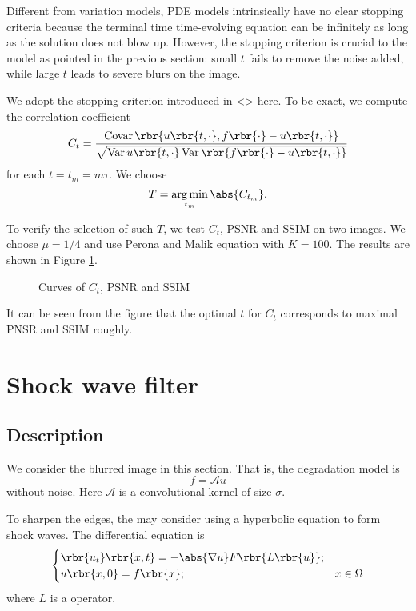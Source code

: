 \documentclass[english, nochinese]{pnote}
\DeclareMathOperator\opvar{\mathrm{Var}}
\DeclareMathOperator\opcovar{\mathrm{Covar}}
\begin{document}
Different from variation models, PDE models intrinsically have no clear stopping criteria because the terminal time time-evolving equation can be infinitely as long as the solution does not blow up. However, the stopping criterion is crucial to the model as pointed in the previous section: small $t$ fails to remove the noise added, while large $t$ leads to severe blurs on the image.

We adopt the stopping criterion introduced in <> here. To be exact, we compute the correlation coefficient
\begin{equation}
C_t = \frac{ \opcovar \rbr{ u \rbr{ t, \cdot }, f \rbr{\cdot} - u \rbr{ t, \cdot } } }{\sqrt{ \opvar u \rbr{ t, \cdot } \opvar \rbr{ f \rbr{\cdot} - u \rbr{ t, \cdot } } }}
\end{equation}
for each $ t = t_m = m \tau $. We choose
\begin{equation}
T = \mathop{\arg\min}_{t_m} \abs{C_{t_m}}.
\end{equation}

To verify the selection of such $T$, we test $C_t$, PSNR and SSIM on two images. We choose $ \mu = 1 / 4 $ and use Perona and Malik equation with $ K = 100 $. The results are shown in Figure \ref{Fig:Corr}.

\begin{figure}[htb]
\centering
\scalebox{0.75}{}
\caption{Curves of $C_t$, PSNR and SSIM}
\label{Fig:Corr}
\end{figure}

It can be seen from the figure that the optimal $t$ for $C_t$ corresponds to maximal PNSR and SSIM roughly.

\section{Shock wave filter}

\subsection{Description}

We consider the blurred image in this section. That is, the degradation model is
\begin{equation}
f = \mathcal{A} u
\end{equation}
without noise. Here $\mathcal{A}$ is a convolutional kernel of size $\sigma$.

To sharpen the edges, the may consider using a hyperbolic equation to form shock waves. The differential equation is
\begin{equation} \label{Eq:Hyp}
\begin{cases}
\rbr{u_t} \rbr{ x, t } = -\abs{ \nabla u } F \rbr{ L \rbr{u} }; \\
u \rbr{ x, 0 } = f \rbr{x}; & x \in \Omega
\end{cases}
\end{equation}
where $L$ is a operator.
\end{document}
